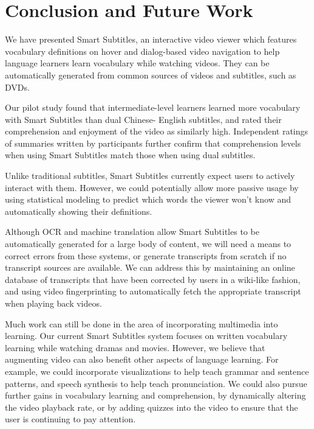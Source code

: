 \documentclass{sigchi}
\begin{document}
\section{Conclusion and Future Work}

We have presented Smart Subtitles, an interactive
video viewer which features vocabulary
definitions on hover and dialog-based video navigation
to help language learners learn vocabulary while watching videos.
They can be automatically generated from
common sources of videos and subtitles, such as DVDs.

Our pilot study found that intermediate-level learners learned more
vocabulary with Smart Subtitles than dual Chinese-
English subtitles, and rated their comprehension and
enjoyment of the video as similarly high.
Independent ratings of summaries written by participants
further confirm that comprehension levels when using Smart Subtitles
match those when using dual subtitles.

Unlike traditional subtitles, Smart Subtitles currently expect users to actively interact with them. However, we could potentially allow more
passive usage by using statistical modeling to predict which words the viewer
won’t know and automatically showing their definitions.

Although OCR and machine translation
allow Smart Subtitles to be automatically generated for a large body of content,
we will need a means to correct errors from these systems,
or generate transcripts from scratch if no transcript sources are available.
We can address this by maintaining an online database of transcripts
that have been corrected by users in a wiki-like fashion, and using video fingerprinting %
to automatically fetch the appropriate transcript when playing back videos.

Much work can still be done in the area of incorporating multimedia into learning. Our current Smart Subtitles system focuses on written vocabulary learning while watching dramas and movies.
However, we believe that augmenting video can also benefit other aspects of language learning. For example, we could
incorporate visualizations to help teach grammar and sentence patterns,
and speech synthesis to help teach pronunciation. We could also 
pursue further gains in vocabulary learning and comprehension,
by dynamically altering the video playback rate, or by adding
quizzes into the video to ensure that the user is continuing to pay attention.
\end{document}

